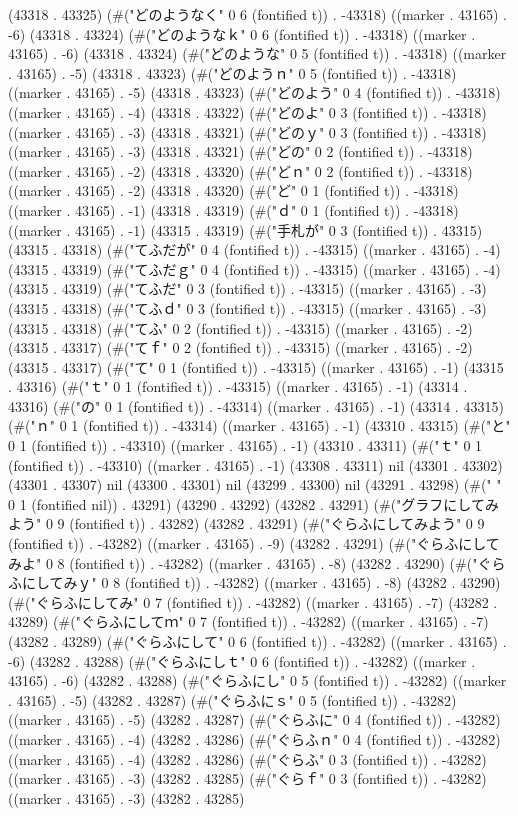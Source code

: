 (43318 . 43325) (#("どのようなく" 0 6 (fontified t)) . -43318) ((marker . 43165) . -6) (43318 . 43324) (#("どのようなｋ" 0 6 (fontified t)) . -43318) ((marker . 43165) . -6) (43318 . 43324) (#("どのような" 0 5 (fontified t)) . -43318) ((marker . 43165) . -5) (43318 . 43323) (#("どのようｎ" 0 5 (fontified t)) . -43318) ((marker . 43165) . -5) (43318 . 43323) (#("どのよう" 0 4 (fontified t)) . -43318) ((marker . 43165) . -4) (43318 . 43322) (#("どのよ" 0 3 (fontified t)) . -43318) ((marker . 43165) . -3) (43318 . 43321) (#("どのｙ" 0 3 (fontified t)) . -43318) ((marker . 43165) . -3) (43318 . 43321) (#("どの" 0 2 (fontified t)) . -43318) ((marker . 43165) . -2) (43318 . 43320) (#("どｎ" 0 2 (fontified t)) . -43318) ((marker . 43165) . -2) (43318 . 43320) (#("ど" 0 1 (fontified t)) . -43318) ((marker . 43165) . -1) (43318 . 43319) (#("ｄ" 0 1 (fontified t)) . -43318) ((marker . 43165) . -1) (43315 . 43319) (#("手札が" 0 3 (fontified t)) . 43315) (43315 . 43318) (#("てふだが" 0 4 (fontified t)) . -43315) ((marker . 43165) . -4) (43315 . 43319) (#("てふだｇ" 0 4 (fontified t)) . -43315) ((marker . 43165) . -4) (43315 . 43319) (#("てふだ" 0 3 (fontified t)) . -43315) ((marker . 43165) . -3) (43315 . 43318) (#("てふｄ" 0 3 (fontified t)) . -43315) ((marker . 43165) . -3) (43315 . 43318) (#("てふ" 0 2 (fontified t)) . -43315) ((marker . 43165) . -2) (43315 . 43317) (#("てｆ" 0 2 (fontified t)) . -43315) ((marker . 43165) . -2) (43315 . 43317) (#("て" 0 1 (fontified t)) . -43315) ((marker . 43165) . -1) (43315 . 43316) (#("ｔ" 0 1 (fontified t)) . -43315) ((marker . 43165) . -1) (43314 . 43316) (#("の" 0 1 (fontified t)) . -43314) ((marker . 43165) . -1) (43314 . 43315) (#("ｎ" 0 1 (fontified t)) . -43314) ((marker . 43165) . -1) (43310 . 43315) (#("と" 0 1 (fontified t)) . -43310) ((marker . 43165) . -1) (43310 . 43311) (#("ｔ" 0 1 (fontified t)) . -43310) ((marker . 43165) . -1) (43308 . 43311) nil (43301 . 43302) (43301 . 43307) nil (43300 . 43301) nil (43299 . 43300) nil (43291 . 43298) (#("	" 0 1 (fontified nil)) . 43291) (43290 . 43292) (43282 . 43291) (#("グラフにしてみよう" 0 9 (fontified t)) . 43282) (43282 . 43291) (#("ぐらふにしてみよう" 0 9 (fontified t)) . -43282) ((marker . 43165) . -9) (43282 . 43291) (#("ぐらふにしてみよ" 0 8 (fontified t)) . -43282) ((marker . 43165) . -8) (43282 . 43290) (#("ぐらふにしてみｙ" 0 8 (fontified t)) . -43282) ((marker . 43165) . -8) (43282 . 43290) (#("ぐらふにしてみ" 0 7 (fontified t)) . -43282) ((marker . 43165) . -7) (43282 . 43289) (#("ぐらふにしてｍ" 0 7 (fontified t)) . -43282) ((marker . 43165) . -7) (43282 . 43289) (#("ぐらふにして" 0 6 (fontified t)) . -43282) ((marker . 43165) . -6) (43282 . 43288) (#("ぐらふにしｔ" 0 6 (fontified t)) . -43282) ((marker . 43165) . -6) (43282 . 43288) (#("ぐらふにし" 0 5 (fontified t)) . -43282) ((marker . 43165) . -5) (43282 . 43287) (#("ぐらふにｓ" 0 5 (fontified t)) . -43282) ((marker . 43165) . -5) (43282 . 43287) (#("ぐらふに" 0 4 (fontified t)) . -43282) ((marker . 43165) . -4) (43282 . 43286) (#("ぐらふｎ" 0 4 (fontified t)) . -43282) ((marker . 43165) . -4) (43282 . 43286) (#("ぐらふ" 0 3 (fontified t)) . -43282) ((marker . 43165) . -3) (43282 . 43285) (#("ぐらｆ" 0 3 (fontified t)) . -43282) ((marker . 43165) . -3) (43282 . 43285) 